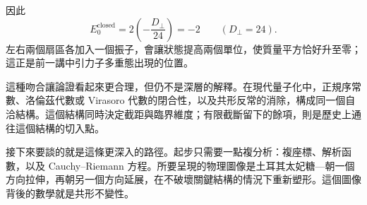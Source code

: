 因此
\begin{equation}
  E_0^{\mathrm{closed}}
  =
  2\left(-\frac{D_\perp}{24}\right)
  =-2
  \qquad (D_\perp=24).
\end{equation}
左右兩個扇區各加入一個振子，會讓狀態提高兩個單位，使質量平方恰好升至零；這正是前一講中引力子多重態出現的位置。

這種吻合讓論證看起來更合理，但仍不是深層的解釋。在現代量子化中，正規序常數、洛倫茲代數或 Virasoro 代數的閉合性，以及共形反常的消除，構成同一個自洽結構。這個結構同時決定截距與臨界維度；有限截斷留下的餘項，則是歷史上通往這個結構的切入點。

接下來要談的就是這條更深入的路徑。起步只需要一點複分析：複座標、解析函數，以及 Cauchy--Riemann 方程。所要呈現的物理圖像是土耳其太妃糖---朝一個方向拉伸，再朝另一個方向延展，在不破壞關鍵結構的情況下重新塑形。這個圖像背後的數學就是共形不變性。
